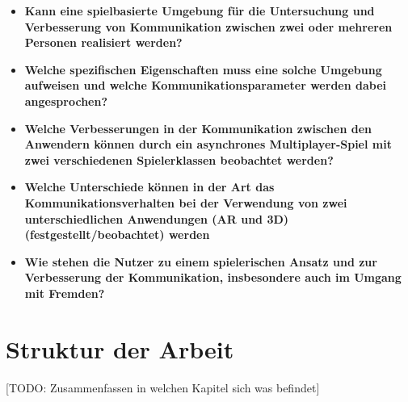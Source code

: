 \begin{itemize}
    \item \textbf{Kann eine spielbasierte Umgebung für die Untersuchung und Verbesserung von Kommunikation zwischen zwei oder mehreren Personen realisiert werden?}
    \item \textbf{Welche spezifischen Eigenschaften muss eine solche Umgebung aufweisen und welche Kommunikationsparameter werden dabei angesprochen?}
    \item \textbf{Welche Verbesserungen in der Kommunikation zwischen den Anwendern können durch ein asynchrones Multiplayer-Spiel mit zwei verschiedenen Spielerklassen beobachtet werden?}
    \item \textbf{Welche Unterschiede können in der Art das Kommunikationsverhalten bei der Verwendung von zwei unterschiedlichen Anwendungen (AR und 3D) (festgestellt/beobachtet) werden}
    \item \textbf{Wie stehen die Nutzer zu einem spielerischen Ansatz und zur Verbesserung der Kommunikation, insbesondere auch im Umgang mit Fremden?}
\end{itemize}

\section{Struktur der Arbeit}

[TODO: Zusammenfassen in welchen Kapitel sich was befindet]